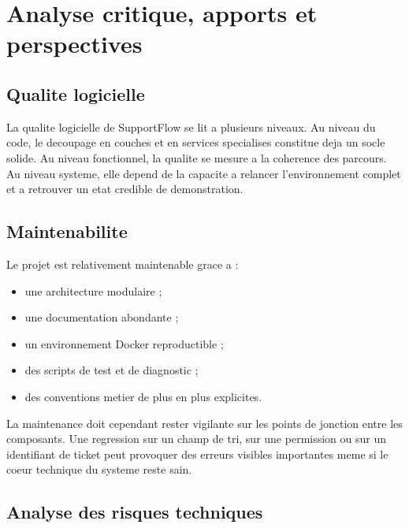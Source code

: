 ﻿\chapter{Analyse critique, apports et perspectives}

\section{Qualite logicielle}

La qualite logicielle de SupportFlow se lit a plusieurs niveaux. Au niveau du code, le decoupage en couches et en services specialises constitue deja un socle solide. Au niveau fonctionnel, la qualite se mesure a la coherence des parcours. Au niveau systeme, elle depend de la capacite a relancer l'environnement complet et a retrouver un etat credible de demonstration.

\section{Maintenabilite}

Le projet est relativement maintenable grace a :

\begin{itemize}[leftmargin=1.2cm]
  \item une architecture modulaire ;
  \item une documentation abondante ;
  \item un environnement Docker reproductible ;
  \item des scripts de test et de diagnostic ;
  \item des conventions metier de plus en plus explicites.
\end{itemize}

La maintenance doit cependant rester vigilante sur les points de jonction entre les composants. Une regression sur un champ de tri, sur une permission ou sur un identifiant de ticket peut provoquer des erreurs visibles importantes meme si le coeur technique du systeme reste sain.

\section{Analyse des risques techniques}

